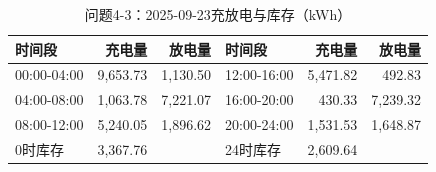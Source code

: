 \begin{table}[H]\centering\small\caption{问题4-3：2025-09-23充放电与库存（kWh）}\label{tab:q4_320250923b}
\begin{tabular}{lrrlrr}\toprule
时间段 & 充电量 & 放电量 & 时间段 & 充电量 & 放电量\\\midrule
00:00-04:00 & 9,653.73 & 1,130.50 & 12:00-16:00 & 5,471.82 & 492.83\\
04:00-08:00 & 1,063.78 & 7,221.07 & 16:00-20:00 & 430.33 & 7,239.32\\
08:00-12:00 & 5,240.05 & 1,896.62 & 20:00-24:00 & 1,531.53 & 1,648.87\\
0时库存 & 3,367.76 &  & 24时库存 & 2,609.64 & \\
\bottomrule\end{tabular}\end{table}
